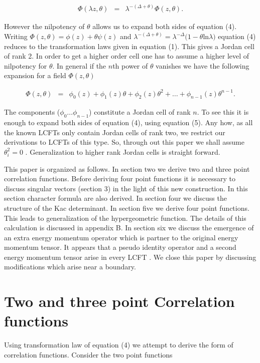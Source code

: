 \documentclass[a4paper,11pt]{article}
\begin{document}
\begin{eqnarray}
\Phi(\lambda z,\theta)&=&\lambda^{-(\Delta+\theta)}\Phi(z,\theta
) .
\end{eqnarray}

However the nilpotency of $\theta$ allows us to expand both sides
of equation (4). Writing $\Phi(z,\theta)=\phi(z)+\theta \psi(z)$
and $\lambda ^{-(\Delta+\theta)} =\lambda^{-\Delta}(1-\theta
$ln$\lambda)$ equation (4) reduces to the transformation laws
given in equation (1). This gives a Jordan cell of rank 2. In
order to get a higher order cell one has to assume a higher level
of nilpotency for $\theta$. In general if the $n$th power of
$\theta$ vanishes we have the following expansion for a field
$\Phi(z,\theta)$

\begin{eqnarray}
\Phi(z,\theta)&=&
\phi_{0}(z)+\phi_{1}(z)\theta+\phi_{2}(z)\theta^{2}+\ldots+\phi_{n-1}(z)\theta^{n-1}
.
\end{eqnarray}

The components ($\phi_{0}\ldots\phi_{n-1}$) constitute a Jordan
cell of rank $n$. To see this it is enough to expand both sides of
equation (4), using equation (5). Any how, as all the known LCFTs
only contain Jordan cells of rank two, we restrict our derivations
to LCFTs of this type. So, through out this paper we shall assume
$\theta_{i}^{2}=0$ . Generalization to higher rank Jordan cells is
straight forward.

This paper is organized as follows. In section
two we derive two and three point correlation functions. Before
deriving four point functions it is necessary to discuss singular
vectors (section 3) in the light of this new construction. In
this section character formula are also derived. In section four
we discuss the structure of the Kac determinant. In section five
we derive four point functions. This leads to generalization of
the hypergeometric function. The details of this calculation is
discussed in appendix B. In section six we discuss the emergence
of an extra energy momentum operator which is partner to the
original energy momentum tensor. It appears that a pseudo
identity operator and a second energy momentum tensor arise in
every LCFT \cite{Gur,GL}. We close this paper by discussing
modifications which arise near a boundary.
\section{Two and three point Correlation functions}
Using transformation law of equation (4) we attempt to derive the
form of correlation functions. Consider the two point functions
\end{document}
